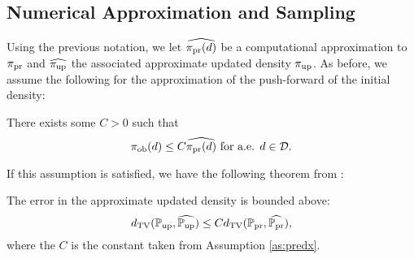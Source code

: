 \subsection{Numerical Approximation and Sampling}\label{sec:approx}
%
%
%
%




Using the previous notation, we let $\widehat{\operatorname*{\pi_{pr}}(d)}$ be a computational approximation to $\operatorname*{\pi_{pr}}$ and $\widehat{\operatorname*{\pi_{up}}}$ the associated approximate updated density $\operatorname*{\pi_{up}}$.
As before, we assume the following for the approximation of the push-forward of the initial density:
\begin{assumption}\label{as:predx}
There exists some $C>0$ such that
\[
\operatorname*{\pi_{ob}} (d) \leq C \widehat{\operatorname*{\pi_{pr}}(d)} \text{ for a.e. } d\in \mathcal{D}.
\]
\end{assumption}

If this assumption is satisfied, we have the following theorem from \cite{BJW18}:
\begin{thm}
  The error in the approximate updated density is bounded above:
  \begin{equation}\label{eq:predicted_bound}
    d_{\text{TV}} (\operatorname*{\mathbb{P}_{up}}, \widehat{\operatorname*{\mathbb{P}_{up}}}) \leq C d_{\text{TV}} (\operatorname*{\mathbb{P}_{pr}}, \widehat{\operatorname*{\mathbb{P}_{pr}}}),
  \end{equation}
  where the $C$ is the constant taken from Assumption \ref{as:predx}.
\end{thm}

